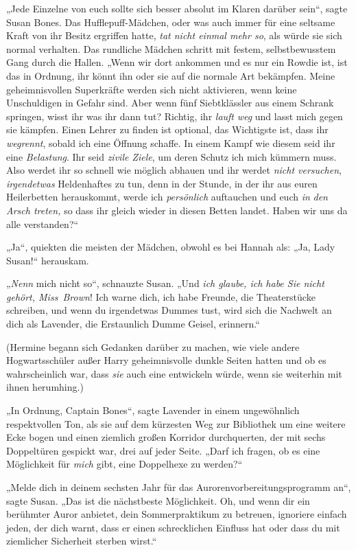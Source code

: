 {„Jede Einzelne von euch sollte sich besser absolut im Klaren darüber sein“, sagte Susan Bones. Das Hufflepuff-Mädchen, oder was auch immer für eine seltsame Kraft von ihr Besitz ergriffen hatte, \emph{tat nicht einmal mehr so}, als würde sie sich normal verhalten. Das rundliche Mädchen schritt mit festem, selbstbewusstem Gang durch die Hallen. „Wenn wir dort ankommen und es nur ein Rowdie ist, ist das in Ordnung, ihr könnt ihn oder sie auf die normale Art bekämpfen. Meine geheimnisvollen Superkräfte werden sich nicht aktivieren, wenn keine Unschuldigen in Gefahr sind. Aber wenn fünf Siebtklässler aus einem Schrank springen, wisst ihr was ihr dann tut? Richtig, ihr \emph{lauft} \emph{weg} und lasst mich gegen sie kämpfen. Einen Lehrer zu finden ist optional, das Wichtigste ist, dass ihr \emph{wegrennt}, sobald ich eine Öffnung schaffe. In einem Kampf wie diesem seid ihr eine \emph{Belastung}. Ihr seid \emph{zivile Ziele}, um deren Schutz ich mich kümmern muss. Also werdet ihr so schnell wie möglich abhauen und ihr werdet \emph{nicht versuchen}, \emph{irgendetwas} Heldenhaftes zu tun, denn in der Stunde, in der ihr aus euren Heilerbetten herauskommt, werde ich \emph{persönlich} auftauchen und euch \emph{in} \emph{den Arsch treten,} so dass ihr gleich wieder in diesen Betten landet\emph{.} Haben wir uns da alle verstanden?“

„Ja“, quiekten die meisten der Mädchen, obwohl es bei Hannah als: „Ja, Lady Susan!“ herauskam.

„\emph{Nenn} mich nicht so“, schnauzte Susan. „Und \emph{ich glaube, ich habe Sie nicht} \emph{gehört, Miss~Brown}! Ich warne dich, ich habe Freunde, die Theaterstücke schreiben, und wenn du irgendetwas Dummes tust, wird sich die Nachwelt an dich als Lavender, die Erstaunlich Dumme Geisel, erinnern.“

(Hermine begann sich Gedanken darüber zu machen, wie viele andere Hogwartsschüler außer Harry geheimnisvolle dunkle Seiten hatten und ob es wahrscheinlich war, dass \emph{sie} auch eine entwickeln würde, wenn sie weiterhin mit ihnen herumhing.)

„In Ordnung, Captain Bones“, sagte Lavender in einem ungewöhnlich respektvollen Ton, als sie auf dem kürzesten Weg zur Bibliothek um eine weitere Ecke bogen und einen ziemlich großen Korridor durchquerten, der mit sechs Doppeltüren gespickt war, drei auf jeder Seite. „Darf ich fragen, ob es eine Möglichkeit für \emph{mich} gibt, eine Doppelhexe zu werden?“

„Melde dich in deinem sechsten Jahr für das Aurorenvorbereitungsprogramm an“, sagte Susan. „Das ist die nächstbeste Möglichkeit. Oh, und wenn dir ein berühmter Auror anbietet, dein Sommerpraktikum zu betreuen, ignoriere einfach jeden, der dich warnt, dass er einen schrecklichen Einfluss hat oder dass du mit ziemlicher Sicherheit sterben wirst.“

}
